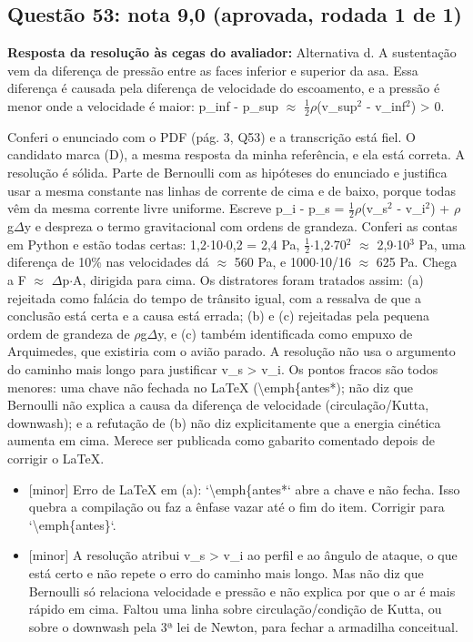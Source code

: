 \documentclass{article}%
\begin{document}
\subsection*{Questão 53: nota 9,0 (aprovada, rodada 1 de 1)}%
\textbf{Resposta da resolução às cegas do avaliador:} Alternativa d. A sustentação vem da diferença de pressão entre as faces inferior e superior da asa. Essa diferença é causada pela diferença de velocidade do escoamento, e a pressão é menor onde a velocidade é maior: p\_inf - p\_sup $\approx$ $\frac12$$\rho$(v\_sup$^2$ - v\_inf$^2$) > 0.\par %
Conferi o enunciado com o PDF (pág. 3, Q53) e a transcrição está fiel. O candidato marca (D), a mesma resposta da minha referência, e ela está correta. A resolução é sólida. Parte de Bernoulli com as hipóteses do enunciado e justifica usar a mesma constante nas linhas de corrente de cima e de baixo, porque todas vêm da mesma corrente livre uniforme. Escreve p\_i - p\_s = $\frac12$$\rho$(v\_s$^2$ - v\_i$^2$) + $\rho$g$\Delta$y e despreza o termo gravitacional com ordens de grandeza. Conferi as contas em Python e estão todas certas: 1,2$\cdot$10$\cdot$0,2 = 2,4 Pa, $\frac12$$\cdot$1,2$\cdot$70$^2$ $\approx$ 2,9$\cdot$10$^3$ Pa, uma diferença de 10\% nas velocidades dá $\approx$ 560 Pa, e 1000$\cdot$10/16 $\approx$ 625 Pa. Chega a F $\approx$ $\Delta$p$\cdot$A, dirigida para cima. Os distratores foram tratados assim: (a) rejeitada como falácia do tempo de trânsito igual, com a ressalva de que a conclusão está certa e a causa está errada; (b) e (c) rejeitadas pela pequena ordem de grandeza de $\rho$g$\Delta$y, e (c) também identificada como empuxo de Arquimedes, que existiria com o avião parado. A resolução não usa o argumento do caminho mais longo para justificar v\_s > v\_i. Os pontos fracos são todos menores: uma chave não fechada no LaTeX (\textbackslash{}emph\{antes*); não diz que Bernoulli não explica a causa da diferença de velocidade (circulação/Kutta, downwash); e a refutação de (b) não diz explicitamente que a energia cinética aumenta em cima. Merece ser publicada como gabarito comentado depois de corrigir o LaTeX.%
\begin{itemize}%
\item%
{[}minor{]} Erro de LaTeX em (a): `\textbackslash{}emph\{antes*` abre a chave e não fecha. Isso quebra a compilação ou faz a ênfase vazar até o fim do item. Corrigir para `\textbackslash{}emph\{antes\}`.%
\item%
{[}minor{]} A resolução atribui v\_s > v\_i ao perfil e ao ângulo de ataque, o que está certo e não repete o erro do caminho mais longo. Mas não diz que Bernoulli só relaciona velocidade e pressão e não explica por que o ar é mais rápido em cima. Faltou uma linha sobre circulação/condição de Kutta, ou sobre o downwash pela 3ª lei de Newton, para fechar a armadilha conceitual.%

\end{itemize}$$
\end{document}
